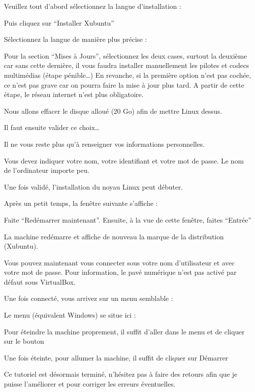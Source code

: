 {Veuillez tout d’abord sélectionnez la langue d’installation : 


Puis cliquez sur “Installer Xubuntu”








Sélectionnez la langue de manière plus précise :



Pour la section “Mises à Jours”, sélectionnez les deux cases, surtout la deuxième car sans cette dernière, il vous faudra installer manuellement les pilotes et codecs multimédias (étape pénible…)
En revanche, si la première option n’est pas cochée, ce n’est pas grave car on pourra faire la mise à jour plus tard.
A partir de cette étape, le réseau internet n’est plus obligatoire.



Nous allons effacer le disque alloué (20 Go) afin de mettre Linux dessus.

Il faut ensuite valider ce choix…

Il ne vous reste plus qu'à renseigner vos informations personnelles.


Vous devez indiquer votre nom, votre identifiant et votre mot de passe.
Le nom de l’ordinateur importe peu.


Une fois validé, l’installation du noyau Linux peut débuter.


Après un petit temps, la fenêtre suivante s’affiche :

Faite “Redémarrer maintenant”.
Ensuite, à la vue de cette fenêtre, faites “Entrée”

La machine redémarre et affiche de nouveau la marque de la distribution (Xubuntu).

Vous pouvez maintenant vous connecter sous votre nom d’utilisateur
et avec votre mot de passe. Pour information, le pavé numérique n’est pas activé par défaut sous VirtualBox.


Une fois connecté, vous arrivez sur un menu semblable :


Le menu (équivalent Windows) se situe ici :



Pour éteindre la machine proprement, il suffit d’aller dans le menu et de cliquer sur le bouton 

Une fois éteinte, pour allumer la machine, il suffit de cliquer sur Démarrer



Ce tutoriel est désormais terminé, n’hésitez pas à faire des retours afin que je puisse l’améliorer et pour corriger les erreurs éventuelles.%

}
